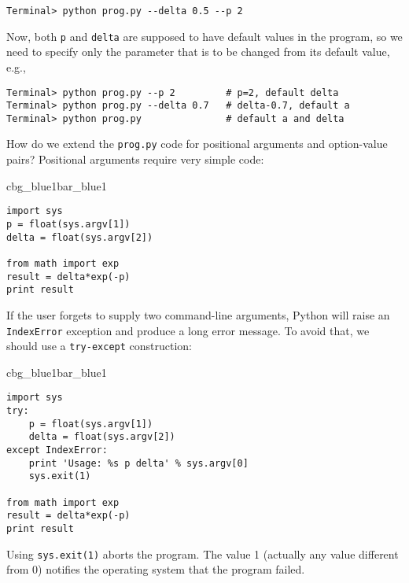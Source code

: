 \documentclass[graybox,sectrefs,envcountresetchap,open=right,final]{svmonodo}
\newenvironment{_pro_tight}[2]{
   \def\FrameCommand{\color{#2}\vrule width 1mm\normalcolor\colorbox{#1}}
   \FrameRule0.6pt\MakeFramed {\advance\hsize-2mm\FrameRestore}\vskip3mm}
   {\vskip0mm\endMakeFramed}
\newenvironment{pro}[2]{
\bgroup\rmfamily
\fboxsep=0mm\relax
\begin{_pro_tight}{#1}{#2}
\list{}{\parsep=-2mm\parskip=0mm\topsep=0pt\leftmargin=2mm
\rightmargin=2\leftmargin\leftmargin=4pt\relax}
\item\relax}
{\endlist\end{_pro_tight}\egroup}
\begin{document}
\begin{Verbatim}[frame=lines,label=\fbox{{\tiny Terminal}},framesep=2.5mm,framerule=0.7pt,fontsize=\fontsize{9pt}{9pt}]
Terminal> python prog.py --delta 0.5 --p 2
\end{Verbatim}
Now, both \texttt{p} and \texttt{delta} are supposed to have default values in the program,
so we need to specify only the parameter that is to be changed from
its default value, e.g.,

\begin{Verbatim}[frame=lines,label=\fbox{{\tiny Terminal}},framesep=2.5mm,framerule=0.7pt,fontsize=\fontsize{9pt}{9pt}]
Terminal> python prog.py --p 2         # p=2, default delta
Terminal> python prog.py --delta 0.7   # delta-0.7, default a
Terminal> python prog.py               # default a and delta
\end{Verbatim}

How do we extend the \texttt{prog.py} code for positional arguments
and option-value pairs? Positional arguments require very simple
code:

\begin{pro}{cbg_blue1}{bar_blue1}\begin{Verbatim}[numbers=none,fontsize=\fontsize{9pt}{9pt},baselinestretch=0.95,xleftmargin=2mm]
import sys
p = float(sys.argv[1])
delta = float(sys.argv[2])

from math import exp
result = delta*exp(-p)
print result
\end{Verbatim}
\end{pro}
\noindent
If the user forgets to supply two command-line arguments, Python will
raise an \texttt{IndexError} exception and produce a long error message.
To avoid that, we should use a \texttt{try-except} construction:

\begin{pro}{cbg_blue1}{bar_blue1}\begin{Verbatim}[numbers=none,fontsize=\fontsize{9pt}{9pt},baselinestretch=0.95,xleftmargin=2mm]
import sys
try:
    p = float(sys.argv[1])
    delta = float(sys.argv[2])
except IndexError:
    print 'Usage: %s p delta' % sys.argv[0]
    sys.exit(1)

from math import exp
result = delta*exp(-p)
print result
\end{Verbatim}
\end{pro}
\noindent
Using \texttt{sys.exit(1)} aborts the program. The value 1 (actually any
value different from 0) notifies the operating system that the
program failed.
\end{document}
